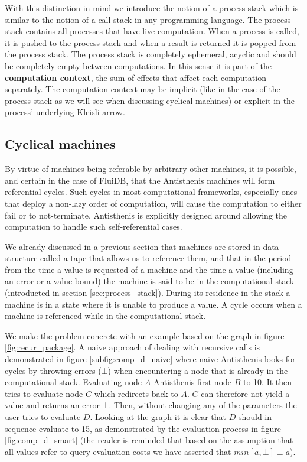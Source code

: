 With this distinction in mind we introduce the notion of a process
stack which is similar to the notion of a call stack in any
programming language. The process stack contains all processes that
have live computation. When a process is called, it is pushed to the
process stack and when a result is returned it is popped from the
process stack. The process stack is completely ephemeral, acyclic and
should be completely empty between computations. In this sense it is
part of the \textbf{computation context}, the sum of effects that
affect each computation separately. The computation context may be
implicit (like in the case of the process stack as we will see when
discussing \hyperref[sec:cyclical_machines]{cyclical machines}) or
explicit in the process' underlying Kleisli arrow.

\subsection{Cyclical machines}
\label{sec:cyclical_machines}

By virtue of machines being referable by arbitrary other machines, it
is possible, and certain in the case of FluiDB, that the Antisthenis
machines will form referential cycles. Such cycles in most
computational frameworks, especially ones that deploy a non-lazy order
of computation, will cause the computation to either fail or to
not-terminate. Antisthenis is explicitly designed around allowing the
computation to handle such self-referential cases.

We already discussed in a previous section that machines are stored in
data structure called a tape that allows us to reference them, and
that in the period from the time a value is requested of a machine and
the time a value (including an error or a value bound) the machine is
said to be in the computational stack (introducted in section
\ref{sec:process_stack}). During its residence in the stack a machine is
in a state where it is unable to produce a value. A cycle occurs when
a machine is referenced while in the computational stack.

We make the problem concrete with an example based on the graph in
figure \ref{fig:recur_package}. A naive approach of dealing with
recursive calls is demonstrated in figure \ref{subfig:comp_d_naive} where
naive-Antisthenis looks for cycles by throwing errors (\(\bot\)) when
encountering a node that is already in the computational
stack. Evaluating node \(A\) Antisthenis first node \(B\) to 10. It
then tries to evaluate node \(C\) which redirects back to \(A\). \(C\)
can therefore not yield a value and returns an error \(\bot\). Then,
without changing any of the parameters the user tries to evaluate
\(D\). Looking at the graph it is clear that \(D\) should in sequence
evaluate to 15, as demonstrated by the evaluation process in figure
\ref{fig:comp_d_smart} (the reader is reminded that based on the assumption
that all values refer to query evaluation costs we have asserted that
\(min[a,\bot] \equiv a\)).


